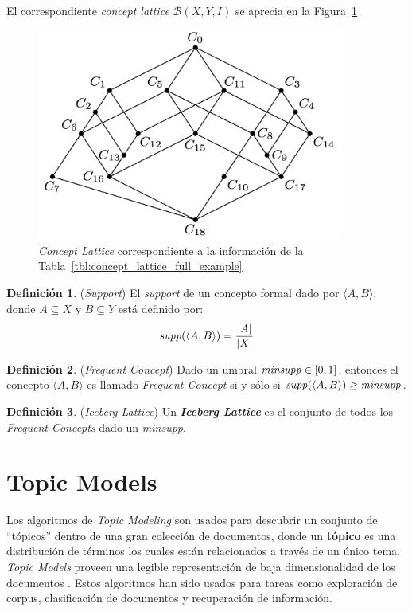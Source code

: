 \documentclass[12pt,oneside,letterpaper]{book}
\newcommand{\eng}[1]{\textit{#1}\xspace}			%
\theoremstyle{definition}
\newtheorem{definition}{Definición}[section]
\newcommand{\Beta}{\mathcal{B}}
\begin{document}
El correspondiente \eng{concept lattice} $\Beta(X,Y,I)$ se aprecia en la Figura~\ref{fig:concept_lattice_full_example}

\begin{figure}[h!]
	\centering
	\includegraphics[width=0.90\textwidth]{images/conceptlattice.png}
	\caption{\eng{Concept Lattice} correspondiente a la información de la Tabla~\ref{tbl:concept_lattice_full_example}}
	\label{fig:concept_lattice_full_example}
\end{figure} 


\newpage


 \begin{definition}{(\eng{Support})}
 El \eng{support} \cite{CodocedoTA11} de un concepto formal dado por $\langle A,B \rangle$, donde $A \subseteq X$ y $B \subseteq Y$ está definido por:
 \begin{equation*}
	\text{\emph{supp}}(\langle A,B \rangle) = \frac{|A|}{|X|}
\end{equation*}
 \end{definition}

 \begin{definition}{(\eng{Frequent Concept})}
 Dado un umbral $\text{\eng{minsupp}} \in [0,1]$, entonces el concepto $\langle A,B \rangle$ es llamado \eng{Frequent Concept} si y sólo si $\text{\emph{supp}}(\langle A,B \rangle) \ge \text{\emph{minsupp}}$.
 \end{definition}

 \begin{definition}{(\eng{Iceberg Lattice})}
 Un \textbf{\eng{Iceberg Lattice}} es el conjunto de todos los \eng{Frequent Concepts} dado un \eng{minsupp}.
 \end{definition}

\section{Topic Models}
\label{sec:topic_models}
Los algoritmos de \eng{Topic Modeling} \cite{TopicModels2009} son usados para descubrir un conjunto de ``{tópicos}'' dentro de una gran colección de documentos, donde un {\bf tópico} es una distribución de términos los cuales están relacionados a través de un único tema. \eng{Topic Models} proveen una legible representación de baja dimensionalidad de los documentos \cite{Chang2009}. Estos algoritmos han sido usados para tareas como exploración de corpus, clasificación de documentos y recuperación de información.
\end{document}

